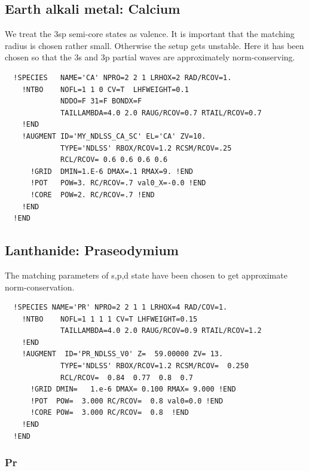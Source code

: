 \documentclass[11pt,a4paper]{report}
\begin{document}
\subsection{Earth alkali metal: Calcium}

We treat the 3sp semi-core states as valence. It is important that the
matching radius is chosen rather small. Otherwise the setup gets
unstable. Here it has been chosen so that the 3s and 3p partial waves
are approximately norm-conserving.
\begin{verbatim}
  !SPECIES   NAME='CA' NPRO=2 2 1 LRHOX=2 RAD/RCOV=1.
    !NTBO    NOFL=1 1 0 CV=T  LHFWEIGHT=0.1
             NDDO=F 31=F BONDX=F
             TAILLAMBDA=4.0 2.0 RAUG/RCOV=0.7 RTAIL/RCOV=0.7
    !END 
    !AUGMENT ID='MY_NDLSS_CA_SC' EL='CA' ZV=10.
             TYPE='NDLSS' RBOX/RCOV=1.2 RCSM/RCOV=.25
             RCL/RCOV= 0.6 0.6 0.6 0.6
      !GRID  DMIN=1.E-6 DMAX=.1 RMAX=9. !END
      !POT   POW=3. RC/RCOV=.7 val0_X=-0.0 !END
      !CORE  POW=2. RC/RCOV=.7 !END
    !END
  !END
\end{verbatim}

\subsection{Lanthanide: Praseodymium}

The matching parameters of s,p,d state have been chosen to get
approximate norm-conservation.


\begin{verbatim}
  !SPECIES NAME='PR' NPRO=2 2 1 1 LRHOX=4 RAD/COV=1.
    !NTBO    NOFL=1 1 1 1 CV=T LHFWEIGHT=0.15
             TAILLAMBDA=4.0 2.0 RAUG/RCOV=0.9 RTAIL/RCOV=1.2
    !END 
    !AUGMENT  ID='PR_NDLSS_V0' Z=  59.00000 ZV= 13.
             TYPE='NDLSS' RBOX/RCOV=1.2 RCSM/RCOV=  0.250
             RCL/RCOV=  0.84  0.77  0.8  0.7
      !GRID DMIN=   1.e-6 DMAX= 0.100 RMAX= 9.000 !END
      !POT  POW=  3.000 RC/RCOV=  0.8 val0=0.0 !END
      !CORE POW=  3.000 RC/RCOV=  0.8  !END
    !END
  !END
\end{verbatim}

\subsubsection{Pr}
\end{document}
